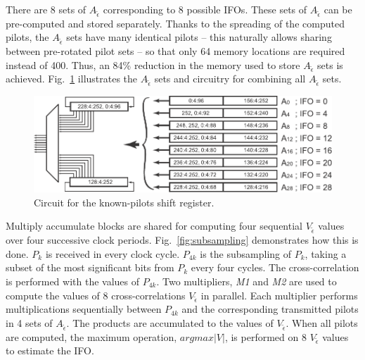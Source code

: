 There are 8 sets of $A_{\tilde{\epsilon}}$ corresponding to 8 possible IFOs.
These sets of $A_{\tilde{\epsilon}}$ can be pre-computed and stored separately.
Thanks to the spreading of the computed pilots, the $A_{\tilde{\epsilon}}$ sets have many identical pilots -- this naturally allows sharing between pre-rotated pilot sets -- so that only 64 memory locations are required instead of 400. Thus, an 84\% reduction in the memory used to store $A_{\tilde{\epsilon}}$ sets is achieved.
Fig.~\ref{fig:Pilots} illustrates the $A_{\tilde{\epsilon}}$ sets and circuitry for combining all $A_{\tilde{\epsilon}}$ sets.
\begin{figure}
	\centerline{\includegraphics [width=1\columnwidth] {figures/Pilots.pdf} }
	\caption{Circuit for the known-pilots shift register.}
	\label{fig:Pilots}
\end{figure}

Multiply accumulate blocks are shared for computing four sequential $V_{\tilde{\epsilon}}$ values over four successive clock periods. Fig.~\ref{fig:subsampling} demonstrates how this is done. $P_k$ is received in every clock cycle. $P_{4k}$ is the subsampling of $P_k$, taking a subset of the most significant bits from $P_k$ every four cycles. The cross-correlation is performed with the values of $P_{4k}$. Two multipliers, \emph{M1} and \emph{M2} are used to compute the values of 8 cross-correlations $V_{\tilde{\epsilon}}$ in parallel. Each multiplier performs multiplications sequentially between $P_{4k}$ and the corresponding transmitted pilots in 4 sets of $A_{\tilde{\epsilon}}$. The products are accumulated to the values of $V_{\tilde{\epsilon}}$. When all pilots are computed, the maximum operation, $argmax|V|$, is performed on 8 $V_{\tilde{\epsilon}}$ values to estimate the IFO.


